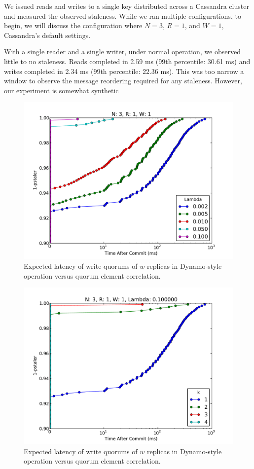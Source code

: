 \documentclass{vldb}
\begin{document}
We issued reads and writes to a single key distributed across a
Cassandra cluster and measured the observed staleness.  While we ran
multiple configurations, to begin, we will discuss the configuration
where $N=3$, $R=1$, and $W=1$, Cassandra's default settings.

With a single reader and a single writer, under normal operation, we
observed little to no staleness.  Reads completed in 2.59 ms (99th
percentile: 30.61 ms) and writes completed in 2.34 ms (99th
percentile: 22.36 ms).  This was too narrow a window to observe the
message reordering required for any staleness.  However, our experiment is somewhat synthetic

\begin{figure}
\centering
\includegraphics[width=.8\columnwidth]{figs/t-cdf.pdf}
\caption{Expected latency of write quorums of $w$ replicas in Dynamo-style operation versus quorum element correlation.}
\label{fig:correlation}
\end{figure}


\begin{figure}
\centering
\includegraphics[width=.8\columnwidth]{figs/t-cdf-k.pdf}
\caption{Expected latency of write quorums of $w$ replicas in Dynamo-style operation versus quorum element correlation.}
\label{fig:correlation}
\end{figure}
\end{document}
